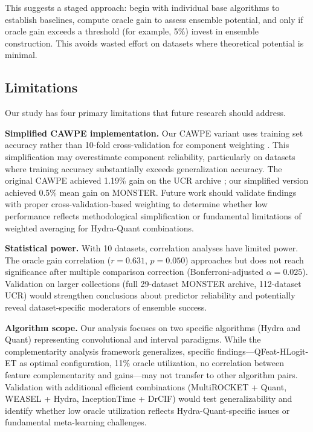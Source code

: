 \documentclass[pdflatex,sn-basic]{sn-jnl}           %
\theoremstyle{thmstyleone}%
\theoremstyle{thmstyletwo}%
\theoremstyle{thmstylethree}%
\begin{document}
This suggests a staged approach: begin with individual base algorithms to establish baselines, compute oracle gain to assess ensemble potential, and only if oracle gain exceeds a threshold (for example, 5\%) invest in ensemble construction. This avoids wasted effort on datasets where theoretical potential is minimal.

\subsection{Limitations}

Our study has four primary limitations that future research should address.

\textbf{Simplified CAWPE implementation.} Our CAWPE variant uses training set accuracy rather than 10-fold cross-validation for component weighting \citep{cawpe}. This simplification may overestimate component reliability, particularly on datasets where training accuracy substantially exceeds generalization accuracy. The original CAWPE achieved 1.19\% gain on the UCR archive \citep[Figure~8]{cawpe}; our simplified version achieved 0.5\% mean gain on MONSTER. Future work should validate findings with proper cross-validation-based weighting to determine whether low performance reflects methodological simplification or fundamental limitations of weighted averaging for Hydra-Quant combinations.

\textbf{Statistical power.} With 10 datasets, correlation analyses have limited power. The oracle gain correlation ($r=0.631$, $p=0.050$) approaches but does not reach significance after multiple comparison correction (Bonferroni-adjusted $\alpha=0.025$). Validation on larger collections (full 29-dataset MONSTER archive, 112-dataset UCR) would strengthen conclusions about predictor reliability and potentially reveal dataset-specific moderators of ensemble success.

\textbf{Algorithm scope.} Our analysis focuses on two specific algorithms (Hydra and Quant) representing convolutional and interval paradigms. While the complementarity analysis framework generalizes, specific findings—QFeat-HLogit-ET as optimal configuration, 11\% oracle utilization, no correlation between feature complementarity and gains—may not transfer to other algorithm pairs. Validation with additional efficient combinations (MultiROCKET + Quant, WEASEL + Hydra, InceptionTime + DrCIF) would test generalizability and identify whether low oracle utilization reflects Hydra-Quant-specific issues or fundamental meta-learning challenges.
\end{document}
